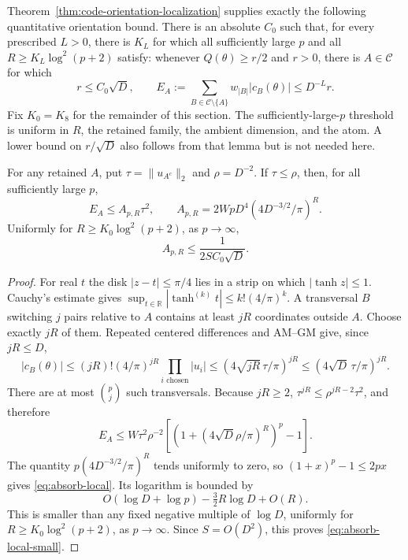 Theorem~\ref{thm:code-orientation-localization} supplies exactly
the following quantitative orientation bound.  There is an absolute $C_0$ such that,
for every prescribed $L>0$, there is $K_L$ for which all sufficiently
large $p$ and all $R\geq K_L\log^2(p+2)$ satisfy: whenever $Q(\theta)\geq r/2$ and $r>0$, there is
$A\in\mathcal C$ for which
\begin{equation}\label{eq:absorb-orientation}
 r\leq C_0\sqrt D,
 \qquad E_A:=\sum_{B\in\mathcal C\setminus\{A\}}
                  w_{|B|}|c_B(\theta)|\leq D^{-L}r.
\end{equation}
Fix $K_0=K_8$ for the remainder of this section.
The sufficiently-large-$p$ threshold is uniform in $R$, the retained
family, the ambient dimension, and the atom.  A lower bound on $r/\sqrt D$
also follows from that lemma but is not needed here.

\begin{lemma}\label{lem:absorb-local}
For any retained $A$, put $\tau=\|u_{A^c}\|_2$ and $\rho=D^{-2}$.
If $\tau\leq\rho$, then, for all sufficiently large $p$,
\begin{equation}\label{eq:absorb-local}
 E_A\leq A_{p,R}\tau^2,
 \qquad
 A_{p,R}=2WpD^4(4D^{-3/2}/\pi)^R.
\end{equation}
Uniformly for $R\geq K_0\log^2(p+2)$, as $p\to\infty$,
\begin{equation}\label{eq:absorb-local-small}
 A_{p,R}\leq\frac1{2S C_0\sqrt D}.
\end{equation}
\end{lemma}
\begin{proof}
For real $t$ the disk $|z-t|\leq\pi/4$ lies in a strip on which
$|\tanh z|\leq1$. Cauchy's estimate gives
$\sup_{t\in\mathbb R}|\tanh^{(k)}t|\leq k!(4/\pi)^k$.
A transversal $B$ switching $j$ pairs relative to $A$ contains at least
$jR$ coordinates outside $A$. Choose exactly $jR$ of them. Repeated
centered differences and AM--GM give, since $jR\le D$,
\[
 |c_B(\theta)|\leq(jR)!(4/\pi)^{jR}\prod_{i\text{ chosen}}|u_i|
 \leq(4\sqrt{jR}\,\tau/\pi)^{jR}
 \leq(4\sqrt D\,\tau/\pi)^{jR}.
\]
There are at most $\binom pj$ such transversals. Because $jR\ge2$,
$\tau^{jR}\le\rho^{jR-2}\tau^2$, and therefore
\[
 E_A\le W\tau^2\rho^{-2}
       \left[(1+(4\sqrt D\rho/\pi)^R)^p-1\right].
\]
The quantity $p(4D^{-3/2}/\pi)^R$ tends uniformly to zero, so
$(1+x)^p-1\le2px$ gives \eqref{eq:absorb-local}.
Its logarithm is bounded by
\[
 O(\log D+\log p)-\tfrac32R\log D+O(R).
\]
This is smaller than any fixed negative multiple of $\log D$,
uniformly for $R\ge K_0\log^2(p+2)$, as $p\to\infty$.
Since $S=O(D^2)$, this proves \eqref{eq:absorb-local-small}.
\end{proof}


